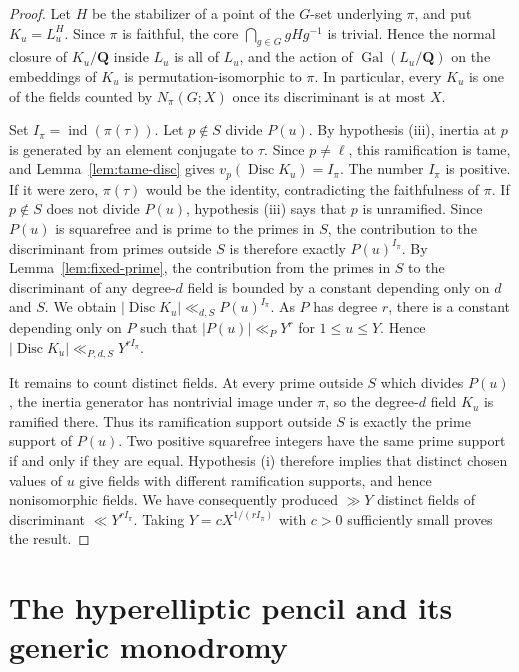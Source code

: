 \documentclass[11pt,hidelinks]{amsart}
\newcommand{\Q}{\mathbf Q}
\newcommand{\Gal}{\operatorname{Gal}}
\newcommand{\ind}{\operatorname{ind}}
\newcommand{\Disc}{\operatorname{Disc}}
\begin{document}
\begin{proof}
Let $H$ be the stabilizer of a point of the $G$-set underlying $\pi$, and
put $K_u=L_u^H$.  Since $\pi$ is faithful, the core
$\bigcap_{g\in G}gHg^{-1}$ is trivial.  Hence the normal closure of
$K_u/\Q$ inside $L_u$ is all of $L_u$, and the action of
$\Gal(L_u/\Q)$ on the embeddings of $K_u$ is permutation-isomorphic to
$\pi$.  In particular, every $K_u$ is one of the fields counted by
$N_\pi(G;X)$ once its discriminant is at most $X$.

Set $I_\pi=\ind(\pi(\tau))$.  Let $p\notin S$ divide $P(u)$.  By
hypothesis (iii), inertia at $p$ is generated by an element conjugate to
$\tau$.  Since $p\neq\ell$, this ramification is tame, and
Lemma~\ref{lem:tame-disc} gives $v_p(\Disc K_u)=I_\pi$. The number $I_\pi$ is positive. If it were zero, $\pi(\tau)$ would be
the identity, contradicting the faithfulness of $\pi$.  If
$p\notin S$ does not divide $P(u)$, hypothesis (iii) says that $p$ is
unramified.  Since $P(u)$ is squarefree and is prime to the primes in
$S$, the contribution to the discriminant from primes outside $S$ is
therefore exactly $P(u)^{I_\pi}$. By Lemma~\ref{lem:fixed-prime}, the contribution from the primes in $S$ to the
discriminant of any degree-$d$ field is bounded by a constant depending
only on $d$ and $S$.  We obtain $|\Disc K_u|\ll_{d,S}P(u)^{I_\pi}$. As $P$ has degree $r$, there is a constant depending only on $P$ such
that $|P(u)|\ll_PY^r$ for $1\leq u\leq Y$.  Hence
$|\Disc K_u|\ll_{P,d,S}Y^{rI_\pi}$.

It remains to count distinct fields.  At every prime outside $S$ which
divides $P(u)$, the inertia generator has nontrivial image under $\pi$,
so the degree-$d$ field $K_u$ is ramified there.  Thus its ramification
support outside $S$ is exactly the prime support of $P(u)$.  Two
positive squarefree integers have the same prime support if and only if
they are equal.  Hypothesis (i) therefore implies that distinct chosen
values of $u$ give fields with different ramification supports, and
hence nonisomorphic fields.  We have consequently produced $\gg Y$
distinct fields of discriminant $\ll Y^{rI_\pi}$.  Taking
$Y=cX^{1/(rI_\pi)}$ with $c>0$ sufficiently small proves the result.
\end{proof}

\section{The hyperelliptic pencil and its generic monodromy}\label{sec:monodromy}
\end{document}
